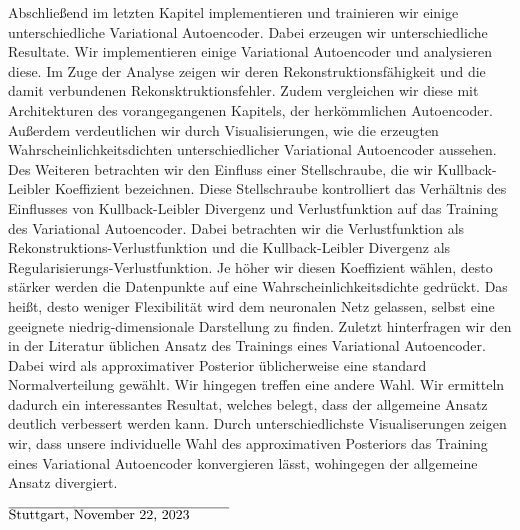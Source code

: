 \documentclass[11pt, twoside, a4paper]{book}
\theoremstyle{plain}
\theoremstyle{definition}
\theoremstyle{plain}
\begin{document}
Abschließend im letzten Kapitel implementieren und trainieren wir einige unterschiedliche Variational Autoencoder. Dabei erzeugen wir unterschiedliche Resultate. Wir implementieren einige Variational Autoencoder und analysieren diese. Im Zuge der Analyse zeigen wir deren Rekonstruktionsfähigkeit und die damit verbundenen Rekonsktruktionsfehler. Zudem vergleichen wir diese mit Architekturen des vorangegangenen Kapitels, der herkömmlichen Autoencoder. Außerdem verdeutlichen wir durch Visualisierungen, wie die erzeugten Wahrscheinlichkeitsdichten unterschiedlicher Variational Autoencoder aussehen.
Des Weiteren betrachten wir den Einfluss einer Stellschraube, die wir Kullback-Leibler Koeffizient bezeichnen. Diese Stellschraube kontrolliert das Verhältnis des Einflusses von Kullback-Leibler Divergenz und Verlustfunktion auf das Training des Variational Autoencoder. Dabei betrachten wir die Verlustfunktion als Rekonstruktions-Verlustfunktion und die Kullback-Leibler Divergenz als Regularisierungs-Verlustfunktion. Je höher wir diesen Koeffizient wählen, desto stärker werden die Datenpunkte auf eine Wahrscheinlichkeitsdichte \glqq gedrückt\grqq{}. Das heißt, desto weniger Flexibilität wird dem neuronalen Netz gelassen, selbst eine geeignete niedrig-dimensionale Darstellung zu finden.
Zuletzt hinterfragen wir den in der Literatur üblichen Ansatz des Trainings eines Variational Autoencoder. Dabei wird als approximativer Posterior üblicherweise eine standard Normalverteilung gewählt. Wir hingegen treffen eine andere Wahl. Wir ermitteln dadurch ein interessantes Resultat, welches belegt, dass der allgemeine Ansatz deutlich verbessert werden kann. Durch unterschiedlichste Visualiserungen zeigen wir, dass unsere individuelle Wahl des approximativen Posteriors das Training eines Variational Autoencoder konvergieren lässt, wohingegen der allgemeine Ansatz divergiert.


\vspace{4 cm}

$\overline{\text{Stuttgart, November 22, 2023} \hspace{1 cm}}$
\end{document}
